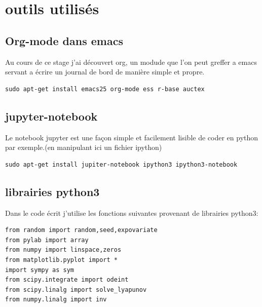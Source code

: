 \documentclass[a4paper]{article}
\begin{document}
\section{outils utilisés}
\subsection{Org-mode dans emacs}
Au cours de ce stage j'ai découvert org, un modude que l'on peut
greffer a emacs servant a écrire un journal de bord de manière simple
et propre.
\begin{verbatim}
sudo apt-get install emacs25 org-mode ess r-base auctex
\end{verbatim}

\subsection{jupyter-notebook}
Le notebook jupyter est une façon simple et facilement lisible de
coder en python par exemple.(en manipulant ici un fichier ipython)

\begin{verbatim}
sudo apt-get install jupiter-notebook ipython3 ipython3-notebook
\end{verbatim}

\subsection{librairies python3}
Dans le code écrit j'utilise les fonctions suivantes provenant de librairies python3:
\begin{lstlisting}
from random import random,seed,expovariate
from pylab import array
from numpy import linspace,zeros
from matplotlib.pyplot import *
import sympy as sym
from scipy.integrate import odeint
from scipy.linalg import solve_lyapunov
from numpy.linalg import inv
\end{lstlisting}



\end{document}
